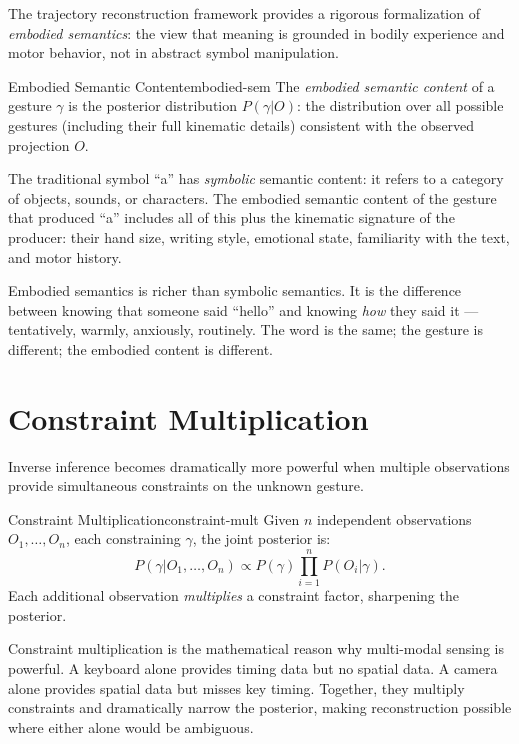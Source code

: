 The trajectory reconstruction framework provides a rigorous formalization
of \emph{embodied semantics}: the view that meaning is grounded in
bodily experience and motor behavior, not in abstract symbol manipulation.

\begin{definition}{Embodied Semantic Content}{embodied-sem}
  The \emph{embodied semantic content} of a gesture $\gamma$ is
  the posterior distribution $P(\gamma | O)$: the distribution over
  all possible gestures (including their full kinematic details)
  consistent with the observed projection $O$.
\end{definition}

The traditional symbol ``a'' has \emph{symbolic} semantic content:
it refers to a category of objects, sounds, or characters. The embodied
semantic content of the gesture that produced ``a'' includes all of this
plus the kinematic signature of the producer: their hand size, writing
style, emotional state, familiarity with the text, and motor history.

Embodied semantics is richer than symbolic semantics. It is the difference
between knowing that someone said ``hello'' and knowing \emph{how} they
said it — tentatively, warmly, anxiously, routinely. The word is the same;
the gesture is different; the embodied content is different.

\section{Constraint Multiplication}

Inverse inference becomes dramatically more powerful when multiple
observations provide simultaneous constraints on the unknown gesture.

\begin{definition}{Constraint Multiplication}{constraint-mult}
  Given $n$ independent observations $O_1, \ldots, O_n$, each
  constraining $\gamma$, the joint posterior is:
  \[
    P(\gamma | O_1, \ldots, O_n) \propto P(\gamma) \prod_{i=1}^n P(O_i | \gamma).
  \]
  Each additional observation \emph{multiplies} a constraint factor,
  sharpening the posterior.
\end{definition}

Constraint multiplication is the mathematical reason why multi-modal
sensing is powerful. A keyboard alone provides timing data but no spatial
data. A camera alone provides spatial data but misses key timing. Together,
they multiply constraints and dramatically narrow the posterior, making
reconstruction possible where either alone would be ambiguous.

